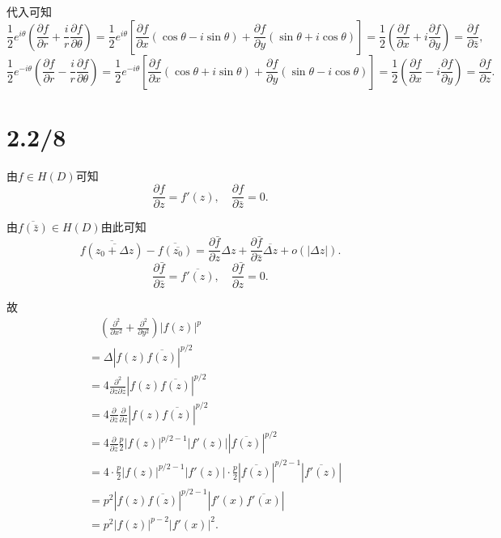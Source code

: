 \documentclass[11pt,a4paper]{article}
\begin{document}
代入可知
$$\frac{1}{2}e^{i\theta}\left(\frac{\partial f}{\partial r}+\frac{i}{r}\frac{\partial f}{\partial\theta}\right)=
  \frac{1}{2}e^{i\theta}\left[\frac{\partial f}{\partial x}(\cos\theta-i\sin\theta)+\frac{\partial f}{\partial y}(\sin\theta+i\cos\theta)\right]=
  \frac{1}{2}\left(\frac{\partial f}{\partial x}+i\frac{\partial f}{\partial y}\right)=\frac{\partial f}{\partial\bar{z}},$$
$$\frac{1}{2}e^{-i\theta}\left(\frac{\partial f}{\partial r}-\frac{i}{r}\frac{\partial f}{\partial\theta}\right)=
  \frac{1}{2}e^{-i\theta}\left[\frac{\partial f}{\partial x}(\cos\theta+i\sin\theta)+\frac{\partial f}{\partial y}(\sin\theta-i\cos\theta)\right]=
  \frac{1}{2}\left(\frac{\partial f}{\partial x}-i\frac{\partial f}{\partial y}\right)=\frac{\partial f}{\partial z}.$$



\section{2.2/8}

由$f\in H(D)$可知
$$\frac{\partial f}{\partial z}=f'(z),\quad \frac{\partial f}{\partial\bar{z}}=0.$$

由$\overline{f(\bar{z})}\in H(D)$由此可知
$$\overline{f(\overline{z_0+\Delta z})}-\overline{f(\overline{z_0})}=\frac{\partial\bar{f}}{\partial z}\Delta z+ \frac{\partial\bar{f}}{\partial\bar{z}}\overline{\Delta z}+o(|\Delta z|).$$
$$\frac{\partial\bar{f}}{\partial\bar{z}}=\overline{f'(z)},\quad\frac{\partial\bar{f}}{\partial z}=0.$$

故
\begin{align*}
   & \quad \left(\frac{\partial^2}{\partial x^2}+\frac{\partial^2}{\partial y^2}\right)|f(z)|^p          \\
   & = \Delta|f(z)\overline{f(z)}|^{p/2}                                                                 \\
   & =4\frac{\partial^2}{\partial z\partial\bar{z}}|f(z)\overline{f(z)}|^{p/2}                           \\
   & =4\frac{\partial}{\partial\bar{z}}\frac{\partial}{\partial z}|f(z)\overline{f(z)}|^{p/2}            \\
   & = 4\frac{\partial}{\partial\bar{z}}\frac{p}{2}|f(z)|^{p/2-1}|f'(z)||\overline{f(z)}|^{p/2}          \\
   & = 4\cdot\frac{p}{2}|f(z)|^{p/2-1}|f'(z)|\cdot\frac{p}{2}|\overline{f(z)}|^{p/2-1}|\overline{f'(z)}| \\
   & =p^2|f(z)\overline{f(z)}|^{p/2-1}|f'(x)\overline{f'(x)}|                                            \\
   & = p^2|f(z)|^{p-2}|f'(x)|^2.
\end{align*}
\end{document}

